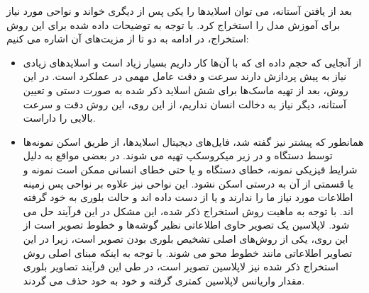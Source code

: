 بعد از یافتن آستانه، می توان اسلاید‌ها را یکی پس از دیگری خواند و نواحی مورد نیاز برای آموزش مدل را استخراج کرد.
با توجه به توضیحات داده شده برای این روش استخراج، در ادامه به دو تا از مزیت‌های آن اشاره می کنیم:
\begin{itemize}
    \item از آنجایی که حجم داده ای که با آن‌ها کار داریم بسیار زیاد است و اسلاید‌های زیادی نیاز به پیش پردازش دارند سرعت و دقت عامل مهمی در عملکرد است.
    در این روش، بعد از تهیه ماسک‌ها برای شش اسلاید ذکر شده به صورت دستی و تعیین آستانه، دیگر نیاز به دخالت انسان نداریم، از این روی، این روش دقت و سرعت بالایی را داراست.
    \item همانطور که پیشتر نیز گفته شد، فایل‌های دیجیتال اسلاید‌ها، از طریق اسکن نمونه‌ها توسط دستگاه و در زیر میکروسکپ تهیه می شوند.
    در بعضی مواقع به دلیل شرایط فیزیکی نمونه، خطای دستگاه و یا حتی خطای انسانی ممکن است نمونه و یا قسمتی از آن به درستی اسکن نشود.
    این نواحی نیز علاوه بر نواحی پس زمینه اطلاعات مورد نیاز ما را ندارند و یا از دست داده اند و حالت بلوری به خود گرفته اند.
    با توجه به ماهیت روش استخراج ذکر شده، این مشکل در این فرآیند حل می شود.
    لاپلاسین یک تصویر حاوی اطلاعاتی نظیر گوشه‌ها و خطوط تصویر است از این روی، یکی از روش‌های اصلی تشخیص بلوری بودن تصویر است، زیرا در این تصاویر اطلاعاتی مانند خطوط محو می شوند.
    با توجه به اینکه مبنای اصلی روش استخراج ذکر شده نیز لاپلاسین تصویر است، در طی این فرآیند تصاویر بلوری مقدار واریانس لاپلاسین کمتری گرفته و خود به خود حذف می گردند.
\end{itemize}
